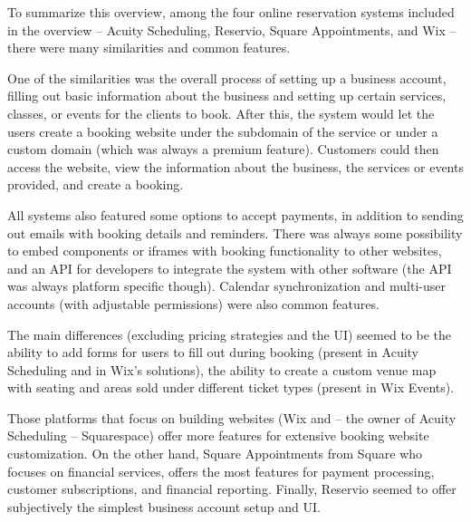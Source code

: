 To summarize this overview, among the four online reservation systems included in the overview -- Acuity Scheduling, Reservio, Square Appointments, and Wix -- there were many similarities and common features.

One of the similarities was the overall process of setting up a business account, filling out basic information about the business and setting up certain services, classes, or events for the clients to book. After this, the system would let the users create a booking website under the subdomain of the service or under a custom domain (which was always a premium feature). Customers could then access the website, view the information about the business, the services or events provided, and create a booking.

All systems also featured some options to accept payments, in addition to sending out emails with booking details and reminders. There was always some possibility to embed components or iframes with booking functionality to other websites, and an API for developers to integrate the system with other software (the API was always platform specific though). Calendar synchronization and multi-user accounts (with adjustable permissions) were also common features.

The main differences (excluding pricing strategies and the UI) seemed to be the ability to add forms for users to fill out during booking (present in Acuity Scheduling and in Wix's solutions), the ability to create a custom venue map with seating and areas sold under different ticket types (present in Wix Events).

Those platforms that focus on building websites (Wix and -- the owner of Acuity Scheduling -- Squarespace) offer more features for extensive booking website customization. On the other hand, Square Appointments from Square who focuses on financial services, offers the most features for payment processing, customer subscriptions, and financial reporting. Finally, Reservio seemed to offer subjectively the simplest business account setup and UI.
